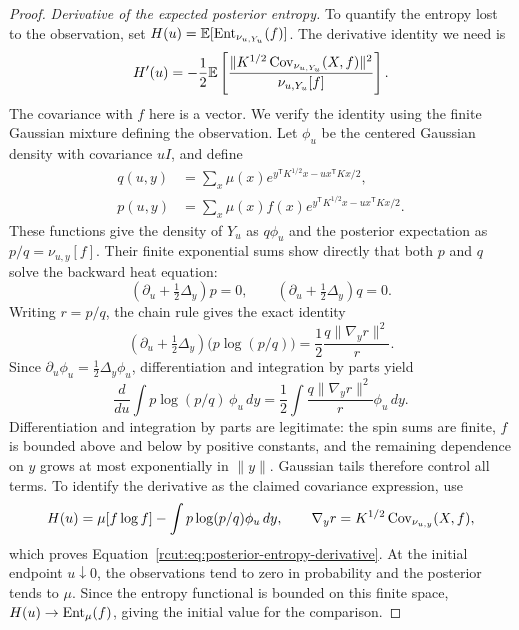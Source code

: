 \begin{proof}
\medskip
\noindent\emph{Derivative of the expected posterior entropy.}
To quantify the entropy lost to the observation, set
$H(u)=\mathbb E[\operatorname{Ent}_{\nu_{u,Y_u}}(f)]$.  The derivative identity we need is
\begin{equation}
 H'(u)=-\frac12\mathbb E\left[
       \frac{\|K^{1/2}\operatorname{Cov}_{\nu_{u,Y_u}}(X,f)\|^2}
            {\nu_{u,Y_u}[f]}\right].
 \label{rcut:eq:posterior-entropy-derivative}
\end{equation}
The covariance with $f$ here is a vector.  We verify the identity using
the finite Gaussian mixture defining the observation.  Let $\phi_u$ be
the centered Gaussian density with covariance $uI$, and define
\begin{align*}
 q(u,y)&=\sum_x\mu(x)
       e^{y^{\mathsf T}K^{1/2}x-u x^{\mathsf T}Kx/2},\\
 p(u,y)&=\sum_x\mu(x)f(x)
       e^{y^{\mathsf T}K^{1/2}x-u x^{\mathsf T}Kx/2}.
\end{align*}
These functions give the density of $Y_u$ as $q\phi_u$ and the
posterior expectation as $p/q=\nu_{u,y}[f]$.  Their finite exponential
sums show directly that both $p$ and $q$ solve the backward heat equation:
\[
 (\partial_u+\tfrac12\Delta_y)p=0,\qquad
 (\partial_u+\tfrac12\Delta_y)q=0.
\]
Writing $r=p/q$, the chain rule gives the exact identity
\[
 (\partial_u+\tfrac12\Delta_y)\bigl(p\log(p/q)\bigr)
     =\frac12\frac{q\|\nabla_y r\|^2}{r}.
\]
Since $\partial_u\phi_u=\tfrac12\Delta_y\phi_u$, differentiation and
integration by parts yield
\[
 \frac{d}{du}\int p\log(p/q)\,\phi_u\,dy
   =\frac12\int\frac{q\|\nabla_y r\|^2}{r}\phi_u\,dy.
\]
Differentiation and integration by parts are legitimate: the spin sums
are finite, $f$ is bounded above and below by positive constants, and
the remaining dependence on $y$ grows at most exponentially in $\|y\|$.
Gaussian tails therefore control all terms.  To identify the derivative
as the claimed covariance expression, use
\[
 H(u)=\mu[f\log f]-\int p\log(p/q)\phi_u\,dy,
 \qquad \nabla_y r=K^{1/2}\operatorname{Cov}_{\nu_{u,y}}(X,f),
\]
which proves Equation~\eqref{rcut:eq:posterior-entropy-derivative}.
At the initial endpoint $u\downarrow0$, the observations tend to zero
in probability and the posterior tends to $\mu$.  Since the entropy
functional is bounded on this finite space,
$H(u)\to\operatorname{Ent}_\mu(f)$, giving the initial value for the comparison.


\end{proof}

